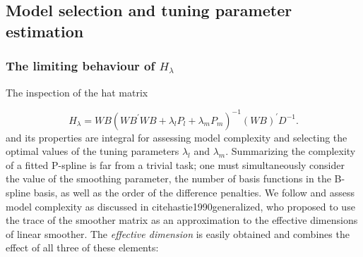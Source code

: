 
\subsection{Model selection and tuning parameter estimation}

%
\subsubsection{The limiting behaviour of $H_\lambda$}


The inspection of the hat matrix 

\[
H_\lambda = W B\left(W B^\prime W B +  \lambda_l P_l + \lambda_m P_m \right)^{-1} \left(W B\right)^\prime D^{-1}.
\]
\noindent
and its properties are integral for assessing model complexity and selecting the optimal values of the tuning parameters $\lambda_l$ and $\lambda_m.$  Summarizing the complexity of a fitted P-spline is far from a trivial task; one must simultaneously consider the value of the smoothing parameter, the number of basis functions in the B-spline basis, as well as the order of the difference penalties. We follow \cite{eilers1996flexible} and\cite{marx2005multidimensional} assess model complexity as discussed in cite{hastie1990generalized}, who proposed to use the trace of the smoother matrix as an approximation  to the effective dimensions of linear smoother. The \emph{effective dimension} is easily obtained and combines the effect of all three of these elements: 

%

